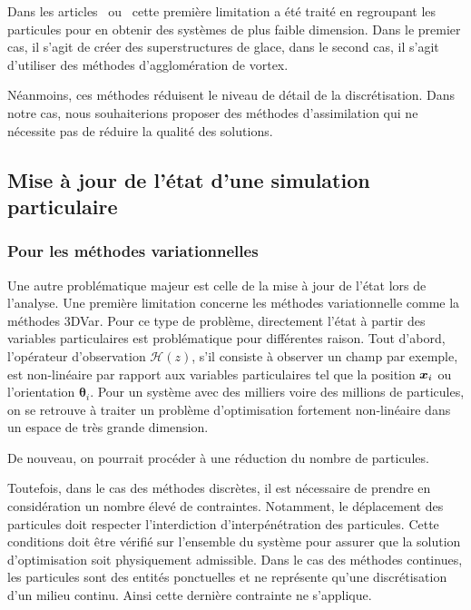 Dans les articles~\cite{chen_superfloe_2022} ou~\cite{darakananda_data-assimilated_2018} cette première limitation a été traité en regroupant les particules pour en obtenir des systèmes de plus faible dimension. Dans le premier cas, il s'agit de créer des superstructures de glace, dans le second cas, il s'agit d'utiliser des méthodes d'agglomération de vortex.

Néanmoins, ces méthodes réduisent le niveau de détail de la discrétisation. Dans notre cas, nous souhaiterions proposer des méthodes d'assimilation qui ne nécessite pas de réduire la qualité des solutions.

\subsection{Mise à jour de l'état d'une simulation particulaire}

\subsubsection{Pour les méthodes variationnelles}

Une autre problématique majeur est celle de la mise à jour de l'état lors de l'analyse.
Une première limitation concerne les méthodes variationnelle comme la méthodes 3DVar. Pour ce type de problème, directement l'état à partir des variables particulaires est problématique pour différentes raison. Tout d'abord, l'opérateur d'observation $\mathcal H(z)$, s'il consiste à observer un champ par exemple, est non-linéaire par rapport aux variables particulaires tel que la position $\bm{x}_i$ ou l'orientation $\bm \theta_i$. Pour un système avec des milliers voire des millions de particules, on se retrouve à traiter un problème d'optimisation fortement non-linéaire dans un espace de très grande dimension.

De nouveau, on pourrait procéder à une réduction du nombre de particules.

Toutefois, dans le cas des méthodes discrètes, il est nécessaire de prendre en considération un nombre élevé de contraintes. Notamment, le déplacement des particules doit respecter l'interdiction d'interpénétration des particules. Cette conditions doit être vérifié sur l'ensemble du système pour assurer que la solution d'optimisation soit physiquement admissible. Dans le cas des méthodes continues, les particules sont des entités ponctuelles et ne représente qu'une discrétisation d'un milieu continu. Ainsi cette dernière contrainte ne s'applique.

